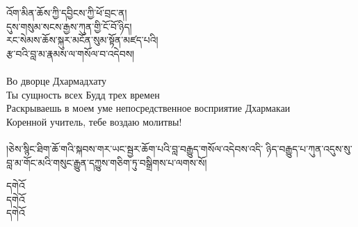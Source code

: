 




{\ti
འོག་མིན་ཆོས་ཀྱི་དབྱིངས་ཀྱི་ཕོ་བྲང་ན། \\
དུས་གསུམ་སངས་རྒྱས་ཀུན་གྱི་ངོ་བོ་ཉིད། \\
རང་སེམས་ཆོས་སྐུར་མངོན་སུམ་སྟོན་མཛད་པའི། \\
རྩ་བའི་བླ་མ་རྣམས་ལ་གསོལ་བ་འདེབས།}\\
\\
\ru
Во дворце Дхармадхату\\
Ты сущность всех Будд трех времен\\
Раскрываешь в моем уме непосредственное восприятие Дхармакаи \\
Коренной учитель, тебе воздаю молитвы!\\
\\


{\ti །ཅེས་སྙིང་ཐིག་ཆོ་གའི་སྐབས་གར་ཡང་སྦྱར་ཆོག་པའི་བླ་བརྒྱུད་གསོལ་འདེབས་འདི་
ཉིད་བརྒྱུད་པ་ཀུན་འདུས་སུ་བླ་མ་གོང་མའི་གསུང་རྒྱུན་དཀྱུས་གཅིག་ཏུ་བསྒྲིགས་པ་ལགས་སོ།}

{\ti
དགེའོ\\
དགེའོ\\
དགེའོ}\\


